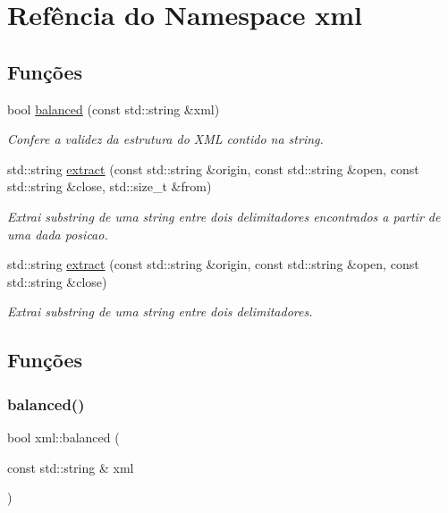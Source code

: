 \hypertarget{namespacexml}{}\section{Refência do Namespace xml}
\label{namespacexml}
\subsection*{Funções}
\begin{DoxyCompactItemize}
\item 
bool \mbox{\hyperlink{namespacexml_a3ef8f381726c12dd6126676f94f0e8eb}{balanced}} (const std\+::string \&xml)
\begin{DoxyCompactList}\small\item\em Confere a validez da estrutura do X\+ML contido na string. \end{DoxyCompactList}\item 
std\+::string \mbox{\hyperlink{namespacexml_a71783e2f9895997decf223259658b1d9}{extract}} (const std\+::string \&origin, const std\+::string \&open, const std\+::string \&close, std\+::size\+\_\+t \&from)
\begin{DoxyCompactList}\small\item\em Extrai substring de uma string entre dois delimitadores encontrados a partir de uma dada posicao. \end{DoxyCompactList}\item 
std\+::string \mbox{\hyperlink{namespacexml_a0737f196962e22c2120336ba27909da1}{extract}} (const std\+::string \&origin, const std\+::string \&open, const std\+::string \&close)
\begin{DoxyCompactList}\small\item\em Extrai substring de uma string entre dois delimitadores. \end{DoxyCompactList}\end{DoxyCompactItemize}


\subsection{Funções}
\mbox{\label{namespacexml_a3ef8f381726c12dd6126676f94f0e8eb}} 
\subsubsection{\texorpdfstring{balanced()}{balanced()}}
{\footnotesize\ttfamily bool xml\+::balanced (\begin{DoxyParamCaption}\item[{const std\+::string \&}]{xml }\end{DoxyParamCaption})}



